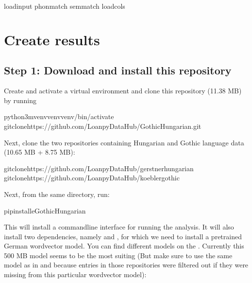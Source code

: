 \documentclass[letterpaper,10pt,english]{sphinxmanual}
\begin{document}
\begin{sphinxVerbatim}[commandchars=\\\{\}]
loadinput
phonmatch
semmatch
loadcols
\end{sphinxVerbatim}

\sphinxstepscope


\chapter{Create results}
\label{\detokenize{workflow:create-results}}\label{\detokenize{workflow::doc}}

\section{Step 1: Download and install this repository}
\label{\detokenize{workflow:step-1-download-and-install-this-repository}}
\sphinxAtStartPar
Create and activate a virtual environment and clone this repository
(11.38 MB) by running

\begin{sphinxVerbatim}[commandchars=\\\{\}]
python3\PYGZhy{}mvenvvenvvenv/bin/activate
gitclonehttps://github.com/LoanpyDataHub/GothicHungarian.git
\end{sphinxVerbatim}

\sphinxAtStartPar
Next, clone the two repositories containing Hungarian and Gothic
language data (10.65 MB + 8.75 MB):

\begin{sphinxVerbatim}[commandchars=\\\{\}]
gitclonehttps://github.com/LoanpyDataHub/gerstnerhungarian
gitclonehttps://github.com/LoanpyDataHub/koeblergothic
\end{sphinxVerbatim}

\sphinxAtStartPar
Next, from the same directory, run:

\begin{sphinxVerbatim}[commandchars=\\\{\}]
pipinstall\PYGZhy{}eGothicHungarian
\end{sphinxVerbatim}

\sphinxAtStartPar
This will install a command\sphinxhyphen{}line interface for running the analysis.
It will also install two dependencies, namely  and
, for which we need to install
a pretrained German word\sphinxhyphen{}vector model. You can find different
models on the . Currently
this 500 MB model seems to be the most suiting (But make sure to use the same
model as in 
and 
because entries in those repositories were filtered out if they were missing
from this particular word\sphinxhyphen{}vector model):
\end{document}
